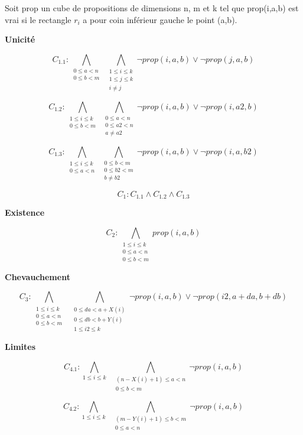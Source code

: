 \documentclass[a4paper,10pt]{article}
\begin{document}
Soit prop un cube de propositions de dimensions n, m et k tel que prop(i,a,b) est vrai si le rectangle $r_i$ a pour coin inférieur gauche le point (a,b).

\textbf{Unicité}

$$C_{1.1} : \bigwedge_{\substack{0 \leq a < n \\ 0 \leq b < m}}\; \bigwedge_{\substack{1 \leq i \leq k \\ 1 \leq j \leq k \\ i \neq j}} \neg prop(i,a,b) \lor \neg prop(j,a,b)$$

$$C_{1.2} : \bigwedge_{\substack{1 \leq i \leq k \\ 0 \leq b < m}}\; \bigwedge_{\substack{0 \leq a < n \\ 0 \leq a2 < n \\ a \neq a2}} \neg prop(i,a,b) \lor \neg prop(i,a2,b)$$

$$C_{1.3} : \bigwedge_{\substack{1 \leq i \leq k \\ 0 \leq a < n}}\; \bigwedge_{\substack{0 \leq b < m \\ 0 \leq b2 < m \\ b \neq b2}} \neg prop(i,a,b) \lor \neg prop(i,a,b2)$$

\begin{center}
$$C_1: C_{1.1} \wedge C_{1.2} \wedge C_{1.3}$$
\end{center}

\textbf{Existence}

$$C_2 : \bigwedge_{\substack{1 \leq i \leq k \\ 0 \leq a < n \\ 0 \leq b < m }} prop(i,a,b) $$

\textbf{Chevauchement}

$$C_3 : \bigwedge_{\substack{1 \leq i \leq k \\ 0 \leq a < n \\ 0 \leq b < m}}\;\; \bigwedge_{\substack{0 \leq da< a + X(i) \\ 0 \leq db < b + Y(i) \\ 1 \leq i2 \leq k}} \neg prop(i,a,b) \lor \neg prop(i2,a+da,b+db)$$

\textbf{Limites}

$$C_{4.1} : \bigwedge_{1 \leq i \leq k} \;\; \bigwedge_{\substack{(n-X(i)+1) \leq a < n \\ 0 \leq b < m}} \neg prop(i,a,b)$$

$$C_{4.2} : \bigwedge_{1 \leq i \leq k} \;\; \bigwedge_{\substack{(m-Y(i)+1) \leq b < m \\ 0 \leq a < n}} \neg prop(i,a,b)$$
\end{document}
